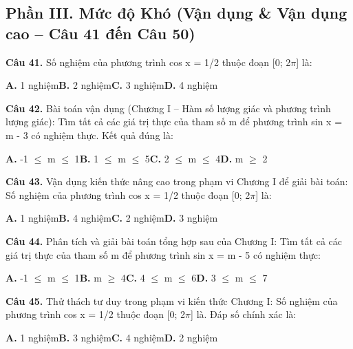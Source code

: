 \documentclass[11pt,a4paper]{article}
\begin{document}
\subsection*{\color{accent} Phần III. Mức độ Khó (Vận dụng \& Vận dụng cao -- Câu 41 đến Câu 50)}
\textbf{\color{primary} Câu 41.} Số nghiệm của phương trình cos x = 1/2 thuộc đoạn [0; 2$\pi$] là:\par
\hspace*{1.5em}\textbf{A.} 1 nghiệm\quad\quad \textbf{B.} 2 nghiệm\quad\quad \textbf{C.} 3 nghiệm\quad\quad \textbf{D.} 4 nghiệm\par\vspace{2pt}
\textbf{\color{primary} Câu 42.} Bài toán vận dụng (Chương I – Hàm số lượng giác và phương trình lượng giác): Tìm tất cả các giá trị thực của tham số m để phương trình sin x = m - 3 có nghiệm thực. Kết quả đúng là:\par
\hspace*{1.5em}\textbf{A.} -1 $\le$ m $\le$ 1\quad\quad \textbf{B.} 1 $\le$ m $\le$ 5\quad\quad \textbf{C.} 2 $\le$ m $\le$ 4\quad\quad \textbf{D.} m $\ge$ 2\par\vspace{2pt}
\textbf{\color{primary} Câu 43.} Vận dụng kiến thức nâng cao trong phạm vi Chương I để giải bài toán: Số nghiệm của phương trình cos x = 1/2 thuộc đoạn [0; 2$\pi$] là:\par
\hspace*{1.5em}\textbf{A.} 1 nghiệm\quad\quad \textbf{B.} 4 nghiệm\quad\quad \textbf{C.} 2 nghiệm\quad\quad \textbf{D.} 3 nghiệm\par\vspace{2pt}
\textbf{\color{primary} Câu 44.} Phân tích và giải bài toán tổng hợp sau của Chương I: Tìm tất cả các giá trị thực của tham số m để phương trình sin x = m - 5 có nghiệm thực:\par
\hspace*{1.5em}\textbf{A.} -1 $\le$ m $\le$ 1\quad\quad \textbf{B.} m $\ge$ 4\quad\quad \textbf{C.} 4 $\le$ m $\le$ 6\quad\quad \textbf{D.} 3 $\le$ m $\le$ 7\par\vspace{2pt}
\textbf{\color{primary} Câu 45.} Thử thách tư duy trong phạm vi kiến thức Chương I: Số nghiệm của phương trình cos x = 1/2 thuộc đoạn [0; 2$\pi$] là. Đáp số chính xác là:\par
\hspace*{1.5em}\textbf{A.} 1 nghiệm\quad\quad \textbf{B.} 3 nghiệm\quad\quad \textbf{C.} 4 nghiệm\quad\quad \textbf{D.} 2 nghiệm\par\vspace{2pt}
\end{document}

